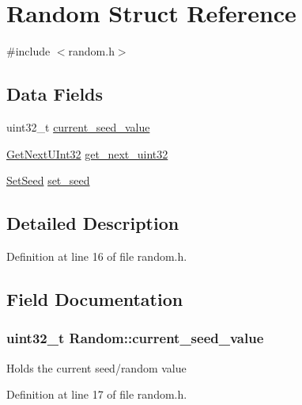 \hypertarget{structRandom}{\section{\-Random \-Struct \-Reference}
\label{d9/d46/structRandom}
}


{\ttfamily \#include $<$random.\-h$>$}

\subsection*{\-Data \-Fields}
\begin{DoxyCompactItemize}
\item 
uint32\-\_\-t \hyperlink{structRandom_ae213ba247901459f5aa0bdafc76b2765}{current\-\_\-seed\-\_\-value}
\item 
\hyperlink{random_8h_a08bec948d164426d71a6522e81d54f1d}{\-Get\-Next\-U\-Int32} \hyperlink{structRandom_af78a2d30ec06d4a719834ff02e9bc212}{get\-\_\-next\-\_\-uint32}
\item 
\hyperlink{random_8h_a19933d7845672b918d5c8e3ec5cdfaec}{\-Set\-Seed} \hyperlink{structRandom_a2c49b2f73e05709704aa1da53e968ff5}{set\-\_\-seed}
\end{DoxyCompactItemize}


\subsection{\-Detailed \-Description}


\-Definition at line 16 of file random.\-h.



\subsection{\-Field \-Documentation}
\hypertarget{structRandom_ae213ba247901459f5aa0bdafc76b2765}{
\subsubsection[{current\-\_\-seed\-\_\-value}]{\setlength{\rightskip}{0pt plus 5cm}uint32\-\_\-t {\bf \-Random\-::current\-\_\-seed\-\_\-value}}}\label{d9/d46/structRandom_ae213ba247901459f5aa0bdafc76b2765}
\-Holds the current seed/random value 

\-Definition at line 17 of file random.\-h.

